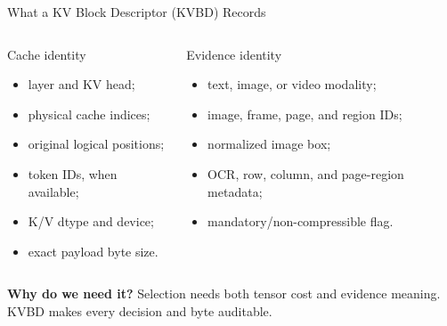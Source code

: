 \documentclass[aspectratio=169,10pt]{beamer}
\newcommand{\whylabel}{\textbf{Why do we need it?}}
\newcommand{\tightitems}{\setlength{\itemsep}{0.28em}\setlength{\parskip}{0pt}}
\begin{document}
\begin{frame}{What a KV Block Descriptor (KVBD) Records}
\scriptsize
\begin{columns}[T,onlytextwidth]
\begin{block}{Cache identity}
\begin{itemize}\tightitems
  \item layer and KV head;
  \item physical cache indices;
  \item original logical positions;
  \item token IDs, when available;
  \item K/V dtype and device;
  \item exact payload byte size.
\end{itemize}
\end{block}
\begin{block}{Evidence identity}
\begin{itemize}\tightitems
  \item text, image, or video modality;
  \item image, frame, page, and region IDs;
  \item normalized image box;
  \item OCR, row, column, and page-region metadata;
  \item mandatory/non-compressible flag.
\end{itemize}
\end{block}
\end{columns}
\begin{alertblock}{\whylabel}
Selection needs both tensor cost and evidence meaning. KVBD makes every decision and byte auditable.
\end{alertblock}
\end{frame}
\end{document}
